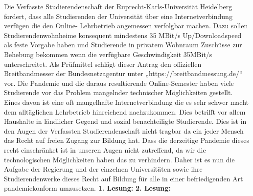     {
        Die Verfasste Studierendenschaft der Ruprecht-Karls-Universität Heidelberg fordert,
        dass alle Studierenden der Universität über eine Internetverbindung verfügen die den
        Online- Lehrbetrieb angemessen verfolgbar machen. Dazu sollen
        Studierendenwohnheime konsequent mindestens 35 MBit/s Up/Downloadspeed als feste
        Vorgabe haben und Studierende in privatem Wohnraum Zuschüsse zur Behebung
        bekommen wenn die verfügbare Geschwindigkeit 35MBit/s unterschreitet. Als
        Prüfmittel schlägt dieser Antrag den offiziellen Breitbandmesser der
        Bundesnetzagentur
        unter „https://breitbandmessung.de/“ vor.
    }{
        Die Pandemie und die daraus resultierende Online-Semester haben viele Studierende vor
        das Problem mangelnder technischer Möglichkeiten gestellt. Eines davon ist eine oft
        mangelhafte Internetverbindung die es sehr schwer macht dem alltäglichen Lehrbetrieb
        hinreichend nachzukommen. Dies betrifft vor allem Haushalte in ländlicher Gegend und
        sozial benachteiligte Studierende. Dies ist in den Augen der Verfassten
        Studierendenschaft nicht tragbar da ein jeder Mensch das Recht auf freien Zugang zur
        Bildung hat. Dass die derzeitige Pandemie dieses recht einschränket ist in unseren Augen
        nicht zutreffend, da wir die technologischen Möglichkeiten haben das zu verhindern.
        Daher ist es nun die Aufgabe der Regierung und der einzelnen Universitäten sowie ihre
        Studierendenwerke dieses Recht auf Bildung für alle in einer befriedigenden Art
        pandemiekonform umzusetzen.
    }{
        \textbf{1. Lesung:}
        \ul{
        }
        \textbf{2. Lesung:}
        \ul{
        }
    }{
    }
